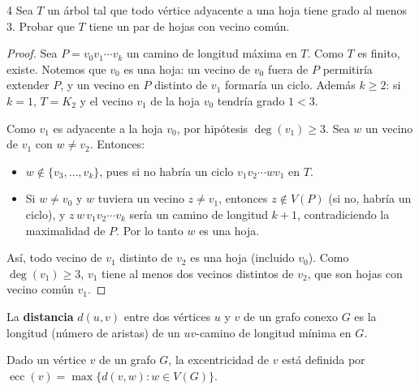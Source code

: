 \vspace{0.5cm}

\begin{ejercicioEntregar}{4}
    Sea \( T \) un árbol tal que todo vértice adyacente a una hoja tiene grado al menos \( 3 \). Probar que \( T \) tiene un par de hojas con vecino común.
\end{ejercicioEntregar}
\begin{proof}
    Sea \( P = v_0 v_1 \cdots v_k \) un camino de longitud máxima en \( T \). Como \( T \) es finito, existe. Notemos que \( v_0 \) es una hoja: un vecino de \( v_0 \) fuera de \( P \) permitiría extender \( P \), y un vecino en \( P \) distinto de \( v_1 \) formaría un ciclo. Además \( k \geq 2 \): si \( k = 1 \), \( T = K_2 \) y el vecino \( v_1 \) de la hoja \( v_0 \) tendría grado \( 1 < 3 \).

    Como \( v_1 \) es adyacente a la hoja \( v_0 \), por hipótesis \( \deg(v_1) \geq 3 \). Sea \( w \) un vecino de \( v_1 \) con \( w \neq v_2 \). Entonces:
    \begin{itemize}
        \item \( w \notin \{v_3, \ldots, v_k\} \), pues si no habría un ciclo \( v_1 v_2 \cdots w v_1 \) en \( T \).
        \item Si \( w \neq v_0 \) y \( w \) tuviera un vecino \( z \neq v_1 \), entonces \( z \notin V(P) \) (si no, habría un ciclo), y \( z\, w\, v_1 v_2 \cdots v_k \) sería un camino de longitud \( k + 1 \), contradiciendo la maximalidad de \( P \). Por lo tanto \( w \) es una hoja.
    \end{itemize}
    Así, todo vecino de \( v_1 \) distinto de \( v_2 \) es una hoja (incluido \( v_0 \)). Como \( \deg(v_1) \geq 3 \), \( v_1 \) tiene al menos dos vecinos distintos de \( v_2 \), que son hojas con vecino común \( v_1 \).
\end{proof}

\vspace{0.5cm}

\begin{definition}
    La \textbf{distancia} \( d(u, v) \) entre dos vértices \( u \) y \( v \) de un grafo conexo \( G \) es la longitud (número de aristas) de un \( uv \)-camino de longitud mínima en \( G \).
\end{definition}

\begin{definition}
    Dado un vértice \( v \) de un grafo \( G \), la excentricidad de \( v \) está definida por \( \operatorname{ecc}(v) = \max \{d(v, w) : w \in V(G)\} \).
\end{definition}

